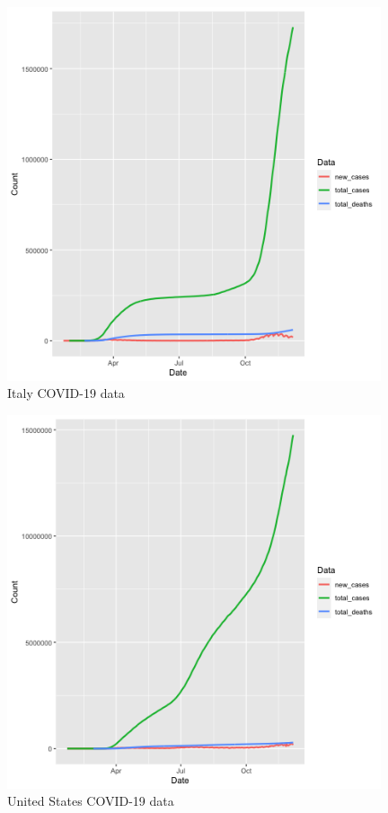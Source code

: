 \documentclass[11pt]{article}
\begin{document}
\begin{figure}[!h]
\centering
  \includegraphics[width=110mm]{R-Code/plots/italyCovid.png}  
  \caption{Italy COVID-19 data}
  \end{figure}

\begin{figure}[!h]
\centering
  \includegraphics[width=110mm]{R-Code/plots/usaCovid.png} 
  \caption{United States COVID-19 data}
\end{figure}

\end{document}
